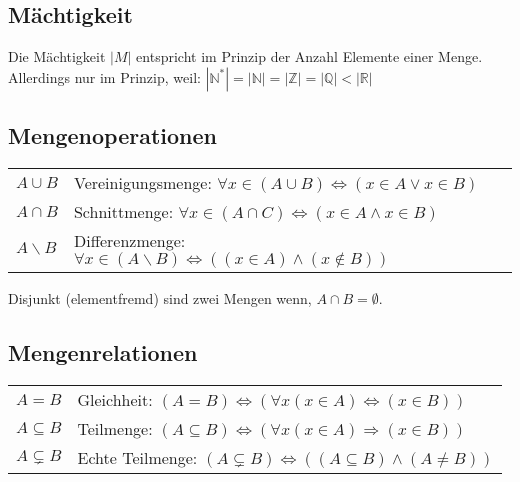 \subsection{Mächtigkeit}
Die Mächtigkeit $|M|$ entspricht im Prinzip der Anzahl Elemente einer Menge. Allerdings nur im Prinzip,
weil: $|\mathbb{N}^*| = |\mathbb{N}| = |\mathbb{Z}| = |\mathbb{Q}| < |\mathbb{R}|$

\subsection{Mengenoperationen}
\settowidth{\MyLenA}{$C = A \cup B$~~}
\begin{tabular}{@{}p{\the\MyLenA}%
				@{}p{\linewidth-\the\MyLenA}}
	$A \cup B$	& Vereinigungsmenge: $\forall x \in (A \cup B) \Leftrightarrow (x \in A \vee x \in B)$ \\
	$A \cap B$	& Schnittmenge: $\forall x \in (A \cap C) \Leftrightarrow (x \in A \wedge x \in B)$\\
	$A \backslash B$ & Differenzmenge: $\forall x \in (A \backslash B) \Leftrightarrow ((x \in A) \wedge (x \notin B))$\\
\end{tabular}
Disjunkt (elementfremd) sind zwei Mengen wenn, $A \cap B = \emptyset$.

\subsection{Mengenrelationen}
\settowidth{\MyLenA}{$C = A \cup B$~~}
\begin{tabular}{@{}p{\the\MyLenA}%
				@{}p{\linewidth-\the\MyLenA}}
	$A = B$	& Gleichheit: $(A = B) \Leftrightarrow (\forall x (x \in A) \Leftrightarrow (x \in B))$\\
	$A \subseteq B$	& Teilmenge: $(A \subseteq B) \Leftrightarrow (\forall x (x \in A) \Rightarrow (x \in B))$\\
	$A \subsetneq B$ & Echte Teilmenge: $(A \subsetneq B) \Leftrightarrow ((A \subseteq B) \wedge (A \neq B))$
\end{tabular}

